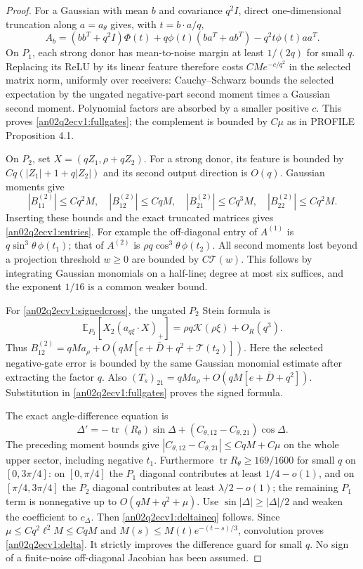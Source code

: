 \documentclass[11pt]{article}
\theoremstyle{remark}\newtheorem{remark}[theorem]{Remark}
\newcommand{\E}{\mathbb E}
\newcommand{\Kfun}{\mathcal K}
\begin{document}
\begin{proof}
For a Gaussian with mean $b$ and covariance $q^2I$, direct
one-dimensional truncation along $a=a_\theta$ gives, with
$t=b\cdot a/q$,
\[
 A_b=(bb^T+q^2I)\Phi(t)+q\phi(t)(ba^T+ab^T)
                     -q^2t\phi(t)aa^T .
\]
On $P_1$, each strong donor has mean-to-noise margin at least
$1/(2q)$ for small $q$. Replacing its ReLU by its linear feature
therefore costs $CM e^{-c/q^2}$ in the selected matrix norm,
uniformly over receivers: Cauchy--Schwarz bounds the selected
expectation by the ungated negative-part second moment times a
Gaussian second moment. Polynomial factors are absorbed by a
smaller positive $c$. This proves \eqref{an02q2ecv1:fullgates};
the complement is bounded by $C\mu$ as in PROFILE Proposition 4.1.

On $P_2$, set $X=(qZ_1,\rho+qZ_2)$. For a strong donor,
its feature is bounded by $Cq(|Z_1|+1+q|Z_2|)$ and its second
output direction is $O(q)$. Gaussian moments give
\[
 |B^{(2)}_{11}|\le Cq^2M,\quad |B^{(2)}_{12}|\le CqM,\quad
 |B^{(2)}_{21}|\le Cq^3M,\quad |B^{(2)}_{22}|\le Cq^2M .
\]
Inserting these bounds and the exact truncated matrices gives
\eqref{an02q2ecv1:entries}. For example the off-diagonal entry
of $A^{(1)}$ is $q\sin^3\theta\,\phi(t_1)$; that of $A^{(2)}$
is $\rho q\cos^3\theta\,\phi(t_2)$.
All second moments lost beyond a projection threshold $w\ge0$
are bounded by $C\mathcal T(w)$. This follows by integrating
Gaussian monomials on a half-line; degree at most six suffices,
and the exponent $1/16$ is a common weaker bound.

For \eqref{an02q2ecv1:signedcross}, the ungated $P_2$ Stein formula is
\[
 \E_{P_2}[X_2(a_{q\xi}\cdot X)_+]
 =\rho q\Kfun(\rho\xi)+O_R(q^3).
\]
Thus $B^{(2)}_{12}=qMa_\rho+
O(qM[e+\overline D+q^2+\mathcal T(t_2)])$.
Here the selected negative-gate error is bounded by the same
Gaussian monomial estimate after extracting the factor $q$.
Also $(T_s)_{21}=qMa_\rho+
O(qM[e+\overline D+q^2])$. Substitution in
\eqref{an02q2ecv1:fullgates} proves the signed formula.

The exact angle-difference equation is
\[
 \Delta'=-\operatorname{tr}(R_\theta)\sin\Delta
                      +(C_{\theta,12}-C_{\theta,21})\cos\Delta .
\]
The preceding moment bounds give
$|C_{\theta,12}-C_{\theta,21}|\le CqM+C\mu$ on the whole
upper sector, including negative $t_1$.
Furthermore $\operatorname{tr}R_\theta\ge169/1600$ for small $q$
on $[0,3\pi/4]$: on $[0,\pi/4]$ the $P_1$ diagonal contributes
at least $1/4-o(1)$, and on $[\pi/4,3\pi/4]$ the $P_2$ diagonal
contributes at least $\lambda/2-o(1)$; the remaining $P_1$
term is nonnegative up to $O(qM+q^2+\mu)$.
Use $\sin|\Delta|\ge|\Delta|/2$ and weaken the coefficient
to $c_\Delta$. Then \eqref{an02q2ecv1:deltaineq} follows.
Since $\mu\le Cq^2\ell^2M\le CqM$ and
$M(s)\le M(t)e^{-(t-s)/3}$, convolution proves
\eqref{an02q2ecv1:delta}. It strictly improves the difference
guard for small $q$. No sign of a finite-noise off-diagonal
Jacobian has been assumed.
\end{proof}
\end{document}
